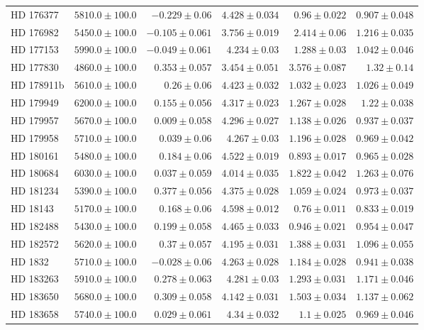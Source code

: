 \begin{longtable*}{lrrrrr}
HD 176377 & $5810.0\pm 100.0$ & $-0.229\pm 0.06$ & $4.428\pm 0.034$ & $0.96\pm 0.022$ & $0.907\pm 0.048$ \\ 
HD 176982 & $5450.0\pm 100.0$ & $-0.105\pm 0.061$ & $3.756\pm 0.019$ & $2.414\pm 0.06$ & $1.216\pm 0.035$ \\ 
HD 177153 & $5990.0\pm 100.0$ & $-0.049\pm 0.061$ & $4.234\pm 0.03$ & $1.288\pm 0.03$ & $1.042\pm 0.046$ \\ 
HD 177830 & $4860.0\pm 100.0$ & $0.353\pm 0.057$ & $3.454\pm 0.051$ & $3.576\pm 0.087$ & $1.32\pm 0.14$ \\ 
HD 178911b & $5610.0\pm 100.0$ & $0.26\pm 0.06$ & $4.423\pm 0.032$ & $1.032\pm 0.023$ & $1.026\pm 0.049$ \\ 
HD 179949 & $6200.0\pm 100.0$ & $0.155\pm 0.056$ & $4.317\pm 0.023$ & $1.267\pm 0.028$ & $1.22\pm 0.038$ \\ 
HD 179957 & $5670.0\pm 100.0$ & $0.009\pm 0.058$ & $4.296\pm 0.027$ & $1.138\pm 0.026$ & $0.937\pm 0.037$ \\ 
HD 179958 & $5710.0\pm 100.0$ & $0.039\pm 0.06$ & $4.267\pm 0.03$ & $1.196\pm 0.028$ & $0.969\pm 0.042$ \\ 
HD 180161 & $5480.0\pm 100.0$ & $0.184\pm 0.06$ & $4.522\pm 0.019$ & $0.893\pm 0.017$ & $0.965\pm 0.028$ \\ 
HD 180684 & $6030.0\pm 100.0$ & $0.037\pm 0.059$ & $4.014\pm 0.035$ & $1.822\pm 0.042$ & $1.263\pm 0.076$ \\ 
HD 181234 & $5390.0\pm 100.0$ & $0.377\pm 0.056$ & $4.375\pm 0.028$ & $1.059\pm 0.024$ & $0.973\pm 0.037$ \\ 
HD 18143 & $5170.0\pm 100.0$ & $0.168\pm 0.06$ & $4.598\pm 0.012$ & $0.76\pm 0.011$ & $0.833\pm 0.019$ \\ 
HD 182488 & $5430.0\pm 100.0$ & $0.199\pm 0.058$ & $4.465\pm 0.033$ & $0.946\pm 0.021$ & $0.954\pm 0.047$ \\ 
HD 182572 & $5620.0\pm 100.0$ & $0.37\pm 0.057$ & $4.195\pm 0.031$ & $1.388\pm 0.031$ & $1.096\pm 0.055$ \\ 
HD 1832 & $5710.0\pm 100.0$ & $-0.028\pm 0.06$ & $4.263\pm 0.028$ & $1.184\pm 0.028$ & $0.941\pm 0.038$ \\ 
HD 183263 & $5910.0\pm 100.0$ & $0.278\pm 0.063$ & $4.281\pm 0.03$ & $1.293\pm 0.031$ & $1.171\pm 0.046$ \\ 
HD 183650 & $5680.0\pm 100.0$ & $0.309\pm 0.058$ & $4.142\pm 0.031$ & $1.503\pm 0.034$ & $1.137\pm 0.062$ \\ 
HD 183658 & $5740.0\pm 100.0$ & $0.029\pm 0.061$ & $4.34\pm 0.032$ & $1.1\pm 0.025$ & $0.969\pm 0.046$ \\ 

\end{longtable*}
